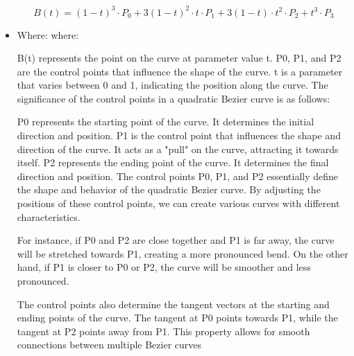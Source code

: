\documentclass{article}
\begin{document}
\begin{itemize}
\[ B(t) = (1-t)^3 \cdot P_0 + 3(1-t)^2 \cdot t \cdot P_1 + 3(1-t) \cdot t^2 \cdot P_2 + t^3 \cdot P_3 \]
\item Where:
where:

B(t) represents the point on the curve at parameter value t.
P0, P1, and P2 are the control points that influence the shape of the curve.
t is a parameter that varies between 0 and 1, indicating the position along the curve.
The significance of the control points in a quadratic Bezier curve is as follows:

P0 represents the starting point of the curve. It determines the initial direction and position.
P1 is the control point that influences the shape and direction of the curve. It acts as a "pull" on the curve, attracting it towards itself.
P2 represents the ending point of the curve. It determines the final direction and position.
The control points P0, P1, and P2 essentially define the shape and behavior of the quadratic Bezier curve. By adjusting the positions of these control points, we can create various curves with different characteristics.

For instance, if P0 and P2 are close together and P1 is far away, the curve will be stretched towards P1, creating a more pronounced bend. On the other hand, if P1 is closer to P0 or P2, the curve will be smoother and less pronounced.

The control points also determine the tangent vectors at the starting and ending points of the curve. The tangent at P0 points towards P1, while the tangent at P2 points away from P1. This property allows for smooth connections between multiple Bezier curves

\end{itemize}
\end{document}
